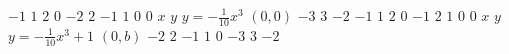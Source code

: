 \documentclass{article}
\begin{document}
$\num{-1}$%
\stopmpxshipout
\mpxshipout%
$\num{1}$%
\stopmpxshipout
\mpxshipout%
$\num{2}$%
\stopmpxshipout
\mpxshipout%
$\num{0}$%
\stopmpxshipout
\mpxshipout%
$\num{-2}$%
\stopmpxshipout
\mpxshipout%
$\num{2}$%
\stopmpxshipout
\mpxshipout%
$\num{-1}$%
\stopmpxshipout
\mpxshipout%
$\num{1}$%
\stopmpxshipout
\mpxshipout%
$\num{0}$%
\stopmpxshipout
\mpxshipout%
$\num{0}$%
\stopmpxshipout
\mpxshipout%
$x$%
\stopmpxshipout
\mpxshipout%
$y$%
\stopmpxshipout
\mpxshipout%
$y=-\frac{1}{10}x^3$%
\stopmpxshipout
\mpxshipout%
$(0,0)$%
\stopmpxshipout
\mpxshipout%
$\num{-3}$%
\stopmpxshipout
\mpxshipout%
$\num{3}$%
\stopmpxshipout
\mpxshipout%
$\num{-2}$%
\stopmpxshipout
\mpxshipout%
$\num{-1}$%
\stopmpxshipout
\mpxshipout%
$\num{1}$%
\stopmpxshipout
\mpxshipout%
$\num{2}$%
\stopmpxshipout
\mpxshipout%
$\num{0}$%
\stopmpxshipout
\mpxshipout%
$\num{-1}$%
\stopmpxshipout
\mpxshipout%
$\num{2}$%
\stopmpxshipout
\mpxshipout%
$\num{1}$%
\stopmpxshipout
\mpxshipout%
$\num{0}$%
\stopmpxshipout
\mpxshipout%
$\num{0}$%
\stopmpxshipout
\mpxshipout%
$x$%
\stopmpxshipout
\mpxshipout%
$y$%
\stopmpxshipout
\mpxshipout%
$y=-\frac{1}{10}x^3+1$%
\stopmpxshipout
\mpxshipout%
$(0,b)$%
\stopmpxshipout
\mpxshipout%
$\num{-2}$%
\stopmpxshipout
\mpxshipout%
$\num{2}$%
\stopmpxshipout
\mpxshipout%
$\num{-1}$%
\stopmpxshipout
\mpxshipout%
$\num{1}$%
\stopmpxshipout
\mpxshipout%
$\num{0}$%
\stopmpxshipout
\mpxshipout%
$\num{-3}$%
\stopmpxshipout
\mpxshipout%
$\num{3}$%
\stopmpxshipout
\mpxshipout%
$\num{-2}$%
\stopmpxshipout
\end{document}
